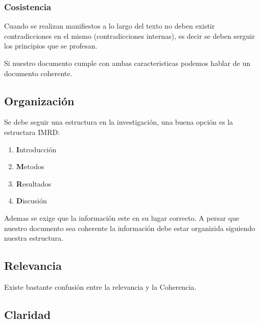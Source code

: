 \documentclass[a4paper, 12pt]{article}
\begin{document}
			\subsubsection{Cosistencia}
				Cuando se realizan manifiestos a lo largo del texto no deben existir contradicciones en el mismo (contradicciones internas), es decir se deben serguir los principios que se profesan. 
				
			Si nuestro documento cumple con ambas caracteristicas podemos hablar de un documento coherente.
		\subsection{Organizaci\'on}
			Se debe seguir una estructura en la investigaci\'on, una buena opci\'on es la estructara IMRD:
			\begin{center}
				\begin{enumerate}
					\item \textbf{I}ntroducci\'on
					\item \textbf{M}etodos
					\item \textbf{R}esultados
					\item \textbf{D}iscusi\'on
				\end{enumerate}
			\end{center}
			Ademas se exige que la informaci\'on este en su lugar correcto. A persar que nuestro documento sea coherente la informaci\'on debe estar organizida siguiendo nuestra estructura.
		\subsection{Relevancia}
			Existe bastante confusi\'on entre la relevancia y la Coherencia.
		\subsection{Claridad}
		
\end{document}
